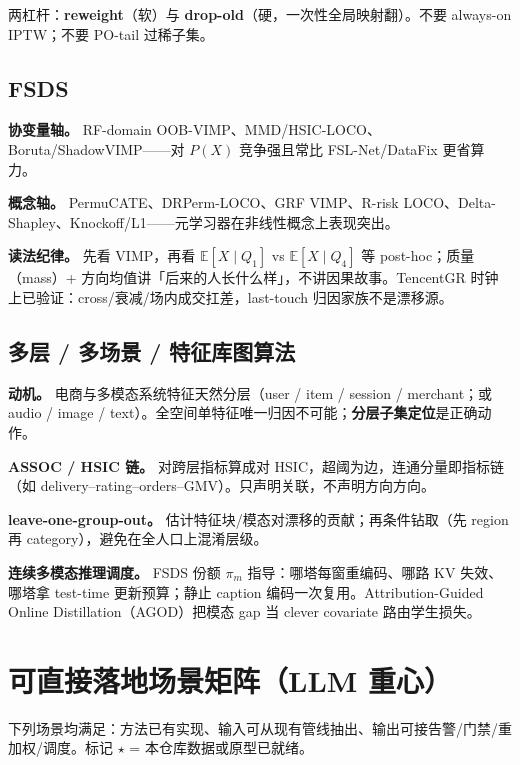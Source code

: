 \documentclass[11pt,a4paper,UTF8,fontset=none]{ctexart}
\begin{document}
两杠杆：\textbf{reweight}（软）与 \textbf{drop-old}（硬，一次性全局映射翻）。不要 always-on IPTW；不要 PO-tail 过稀子集。

\subsection{FSDS}
\textbf{协变量轴。} RF-domain OOB-VIMP、MMD/HSIC-LOCO、Boruta/ShadowVIMP——对 \(P(X)\) 竞争强且常比 FSL-Net/DataFix 更省算力。

\textbf{概念轴。} PermuCATE、DRPerm-LOCO、GRF VIMP、R-risk LOCO、Delta-Shapley、Knockoff/L1——元学习器在非线性概念上表现突出。

\textbf{读法纪律。} 先看 VIMP，再看 \(\mathbb{E}[X\mid Q_1]\) vs \(\mathbb{E}[X\mid Q_4]\) 等 post-hoc；质量（mass）+ 方向均值讲「后来的人长什么样」，不讲因果故事。TencentGR 时钟上已验证：cross/衰减/场内成交扛差，last-touch 归因家族不是漂移源。

\subsection{多层 / 多场景 / 特征库图算法}
\textbf{动机。} 电商与多模态系统特征天然分层（user / item / session / merchant；或 audio / image / text）。全空间单特征唯一归因不可能；\textbf{分层子集定位}是正确动作。

\textbf{ASSOC / HSIC 链。} 对跨层指标算成对 HSIC，超阈为边，连通分量即指标链（如 delivery--rating--orders--GMV）。只声明关联，不声明方向方向。

\textbf{leave-one-group-out。} 估计特征块/模态对漂移的贡献；再条件钻取（先 region 再 category），避免在全人口上混淆层级。

\textbf{连续多模态推理调度。} FSDS 份额 \(\pi_m\) 指导：哪塔每窗重编码、哪路 KV 失效、哪塔拿 test-time 更新预算；静止 caption 编码一次复用。Attribution-Guided Online Distillation（AGOD）把模态 gap 当 clever covariate 路由学生损失。

\section{可直接落地场景矩阵（LLM 重心）}
\label{sec:scenarios}

下列场景均满足：方法已有实现、输入可从现有管线抽出、输出可接告警/门禁/重加权/调度。标记 \(\star\) = 本仓库数据或原型已就绪。
\end{document}
